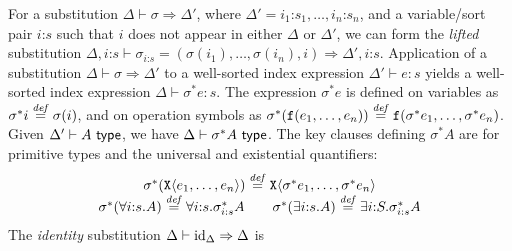 For a substitution $\Delta \vdash \sigma \Rightarrow
\Delta'$, where $\Delta' = i_1\mathord:s_1,\ldots,i_n\mathord:s_n$, and a
variable/sort pair $i\mathord:s$ such that $i$ does not appear in
either $\Delta$ or $\Delta'$, we can form the \emph{lifted}
substitution $\Delta,i\mathord:s \vdash
\sigma_{i\mathord:s} = (\sigma(i_1), \ldots, \sigma(i_n), i) \Rightarrow
\Delta',i\mathord:s$. %
%
Application of a substitution $\Delta \vdash \sigma
\Rightarrow \Delta'$ to a well-sorted index expression $\Delta' \vdash
e : s$ yields a well-sorted index expression $\Delta \vdash \sigma^*e
: s$. The expression $\sigma^*e$ is defined on variables as $\sigma^*i
\stackrel{\mathit{def}}= \sigma(i)$, and on operation symbols as
$\sigma^*(\textup{\texttt{f}}(e_1,\ldots,e_n)) \stackrel{\mathit{def}}=
\textup{\texttt{f}}(\sigma^*e_1, \ldots, \sigma^*e_n)$.  %
Given
$\Delta' \vdash A \textup{\textsf{ type}}$, 
we have $\Delta \vdash \sigma^*A
\textup{\textsf{ type}}$. The key clauses defining $\sigma^*A$ are for primitive types
and the universal and existential quantifiers:
\begin{displaymath}
  \begin{array}{c}
    \sigma^*(\tyPrim{X}{e_1,\ldots,e_n}) \isDefinedAs \tyPrim{X}{\sigma^*e_1,\ldots,\sigma^*e_n}
    \\
    \begin{array}{c@{\hspace{2em}}c}
      \sigma^*(\forall i\mathord:s.A) \isDefinedAs \forall i\mathord:s.\sigma_{i\mathord:s}^*A
      &
      \sigma^*(\exists i\mathord:s.A) \isDefinedAs \exists i\mathord:S. \sigma_{i\mathord:s}^*A
    \end{array}
  \end{array}
\end{displaymath}
The \emph{identity} substitution $\Delta \vdash
\mathrm{id}_\Delta \Rightarrow \Delta$ is %
